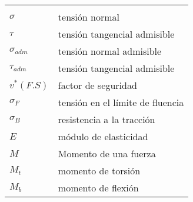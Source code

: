 \begin{mytable}[H]
	\centering
	\begin{tabular}{ll}
		\multicolumn{1}{c}{\quad\quad\quad} & \multicolumn{1}{c}{} \\
		$\sigma$\quad\quad\quad& tensión normal \\	
		$\tau$ & tensión tangencial admisible \\
		$\sigma_{adm}$ & tensión normal admisible \\
		$\tau_{adm}$ & tensión tangencial admisible \\
		$v^* (F.S)$ & factor de seguridad \\
		$\sigma_{F}$ & tensión en el límite de fluencia \\
		$\sigma_{B}$ & resistencia a la tracción \\
		$E$ & módulo de elasticidad \\
		$M$ & Momento de una fuerza \\
		$M_{t}$ & momento de torsión \\
		$M_{b}$ & momento de flexión \\
	\end{tabular}
\end{mytable}



